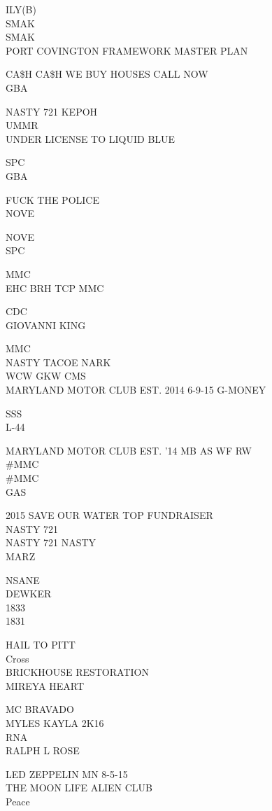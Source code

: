 \documentclass[10pt,letterpaper]{article}
\begin{document}
ILY(B)\\
SMAK\\
SMAK\\
PORT COVINGTON FRAMEWORK MASTER PLAN

CA\$H CA\$H WE BUY HOUSES CALL NOW\\
GBA

NASTY 721 KEPOH\\
UMMR\\
UNDER LICENSE TO LIQUID BLUE

SPC\\
GBA

FUCK THE POLICE\\
NOVE

NOVE\\
SPC

MMC\\
EHC BRH TCP MMC

CDC\\
GIOVANNI KING

MMC\\
NASTY TACOE NARK\\
WCW GKW CMS\\
MARYLAND MOTOR CLUB EST. 2014 6{-}9{-}15 G{-}MONEY

SSS\\
L{-}44

MARYLAND MOTOR CLUB EST. '14 MB AS WF RW\\
\#MMC\\
\#MMC\\
GAS

2015 SAVE OUR WATER TOP FUNDRAISER\\
NASTY 721\\
NASTY 721 NASTY\\
MARZ

NSANE\\
DEWKER\\
1833\\
1831

HAIL TO PITT\\
Cross\\
BRICKHOUSE RESTORATION\\
MIREYA HEART

MC BRAVADO\\
MYLES KAYLA 2K16\\
RNA\\
RALPH L ROSE

LED ZEPPELIN MN 8{-}5{-}15\\
THE MOON LIFE ALIEN CLUB\\
Peace
\end{document}
